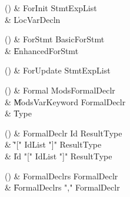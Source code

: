 \begin{bbgrammarappendix}

() & ForInit \label{prod:ForInit}  \: StmtExpList  \\

 &    \| LocVarDecln \\

\end{bbgrammarappendix}

\begin{bbgrammarappendix}

() & ForStmt \label{prod:ForStmt}  \: BasicForStmt  \\

 &    \| EnhancedForStmt \\

\end{bbgrammarappendix}

\begin{bbgrammarappendix}

() & ForUpdate \label{prod:ForUpdate}  \: StmtExpList  \\


\end{bbgrammarappendix}

\begin{bbgrammarappendix}

() & Formal \label{prod:Formal}  \: Mods\opt FormalDeclr  \\

 &    \| Mods\opt VarKeyword FormalDeclr \\
 &    \| Type \\

\end{bbgrammarappendix}

\begin{bbgrammarappendix}

() & FormalDeclr \label{prod:FormalDeclr}  \: Id ResultType  \\

 &    \| \xcd"[" IdList \xcd"]" ResultType \\
 &    \| Id \xcd"[" IdList \xcd"]" ResultType \\

\end{bbgrammarappendix}

\begin{bbgrammarappendix}

() & FormalDeclrs \label{prod:FormalDeclrs}  \: FormalDeclr  \\

 &    \| FormalDeclrs \xcd"," FormalDeclr \\

\end{bbgrammarappendix}


